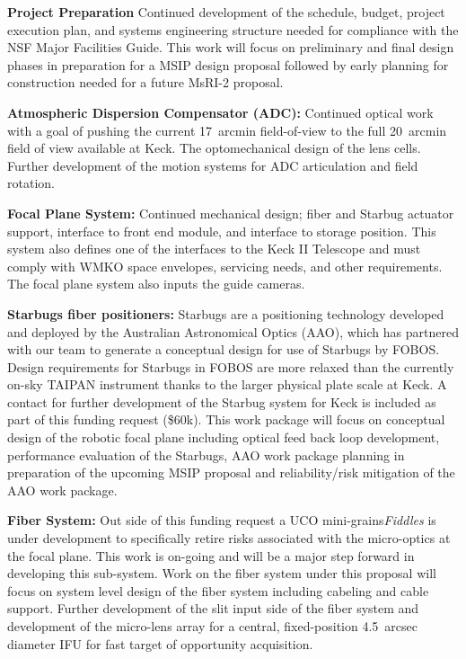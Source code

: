 \noindent \textbf{Project Preparation} Continued development of the
schedule, budget, project execution plan, and systems engineering
structure needed for compliance with the NSF Major Facilities Guide.
This work will focus on preliminary and final design phases in
preparation for a MSIP design proposal followed by early planning for
construction needed for a future MsRI-2 proposal. 

\noindent \textbf{Atmospheric Dispersion Compensator (ADC):} Continued
optical work with a goal of pushing the current 17~arcmin field-of-view
to the full 20~arcmin field of view available at Keck.  The
optomechanical design of the lens cells.  Further development of the
motion systems for ADC articulation and field rotation.

\noindent \textbf{Focal Plane System:} Continued mechanical design;
fiber and Starbug actuator support, interface to front end module, and
interface to storage position. This system also defines one of the
interfaces to the Keck II Telescope and must comply with WMKO space
envelopes, servicing needs, and other requirements. The focal plane
system also inputs the guide cameras. 

\noindent \textbf{Starbugs fiber positioners:} Starbugs are a
positioning technology developed and deployed by the Australian
Astronomical Optics (AAO), which has partnered with our team to
generate a conceptual design for use of Starbugs by FOBOS.  Design
requirements for Starbugs in FOBOS are more relaxed than the currently
on-sky TAIPAN instrument thanks to the larger physical plate scale at
Keck. A contact for further development of the Starbug system for Keck
is included as part of this funding request (\$60k).  This work package
will focus on conceptual design of the robotic focal plane including
optical feed back loop development, performance evaluation of the
Starbugs, AAO work package planning in preparation of the upcoming MSIP
proposal and reliability/risk mitigation of the AAO work package.

\noindent \textbf{Fiber System:} Out side of this funding request a UCO
mini-grains{\it Fiddles} is under development to specifically retire
risks associated with the micro-optics at the focal plane.  This work is
on-going and will be a major step forward in developing this sub-system.
Work on the fiber system under this proposal will focus on system level
design of the fiber system including cabeling and cable support. Further
development of the slit input side of the fiber system and development
of the micro-lens array for a central, fixed-position 4.5~arcsec
diameter IFU for fast target of opportunity acquisition.


